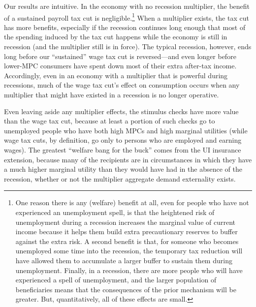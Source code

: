 \documentclass[\econtexRoot/HAFiscal]{subfiles}
\begin{document}
Our results are intuitive.  In the economy with no recession multiplier, the benefit of a sustained payroll tax cut is negligible.\footnote{
One reason there is any (welfare) benefit at all, even for people who have not experienced an unemployment spell, is that the heightened risk of unemployment during a recession increases the marginal value of current income because it helps them build extra precautionary reserves to buffer against the extra risk.  A second benefit is that, for someone who becomes unemployed some time into the recession, the temporary tax reduction will have allowed them to accumulate a larger buffer to sustain them during unemployment.  Finally, in a recession, there are more people who will have experienced a spell of unemployment, and the larger population of beneficiaries means that the consequences of the prior mechanism will be greater.  But, quantitatively, all of these effects are small.}
When a multiplier exists, the tax cut has more benefits, especially if the recession continues long enough that most of the spending induced by the tax cut happens while the economy is still in recession (and the multiplier still is in force).  The typical recession, however, ends long before our ``sustained'' wage tax cut is reversed---and even longer before lower-MPC consumers have spent down most of their extra after-tax income. Accordingly, even in an economy with a multiplier that is powerful during recessions, much of the wage tax cut's effect on consumption occurs when any multiplier that might have existed in a recession is no longer operative.

Even leaving aside any multiplier effects, the stimulus checks have more value than the wage tax cut, because at least a portion of such checks go to unemployed people who have both high MPCs and high marginal utilities (while wage tax cuts, by definition, go only to persons who are employed and earning wages). The greatest ``welfare bang for the buck'' comes from the UI insurance extension, because many of the recipients are in circumstances in which they have a much higher marginal utility than they would have had in the absence of the recession, whether or not the multiplier aggregate demand externality exists.
\end{document}
